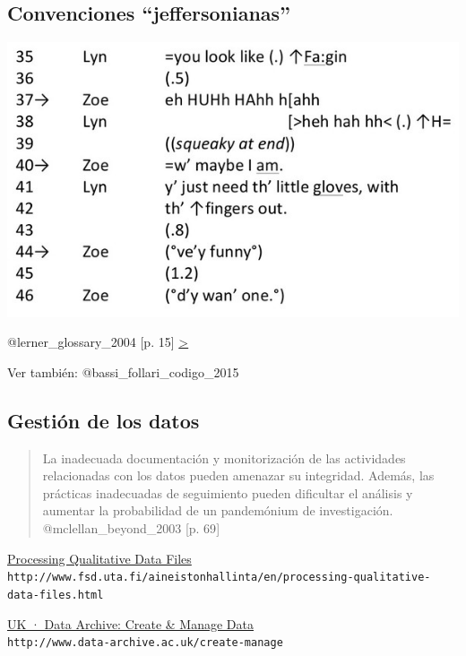 \hypertarget{convenciones-jeffersonianas}{%
\subsection{Convenciones
``jeffersonianas''}\label{convenciones-jeffersonianas}}

\includegraphics{imagenes-cuali/Transcripcion.jpg}

@lerner\_glossary\_2004 {[}p. 15{]}
\href{https://www.dropbox.com/s/q0sardadq3ijqsa/JeffersonianTranscriptionNotationCast.pdf?dl=0}{\textgreater{}}

Ver también: @bassi\_follari\_codigo\_2015

\hypertarget{gestion-datos-1}{%
\subsection{Gestión de los datos}\label{gestion-datos-1}}

\begin{quote}
La inadecuada documentación y monitorización de las actividades
relacionadas con los datos pueden {amenazar su integridad}. Además, las
prácticas inadecuadas de seguimiento pueden dificultar el análisis y
aumentar la probabilidad de un {pandemónium} de investigación.\\
@mclellan\_beyond\_2003 {[}p. 69{]}
\end{quote}

\href{http://www.fsd.uta.fi/aineistonhallinta/en/processing-qualitative-data-files.html}{Processing
Qualitative Data Files}\\
\texttt{http://www.fsd.uta.fi/aineistonhallinta/en/processing-qualitative-data-files.html}

\href{http://www.data-archive.ac.uk/create-manage}{UK · Data Archive:
Create \& Manage Data}\\
\texttt{http://www.data-archive.ac.uk/create-manage}

